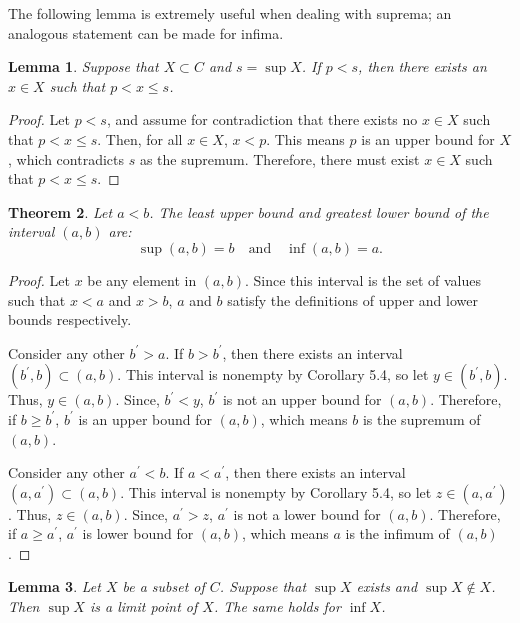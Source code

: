 \documentclass{amsart}
\newtheorem{theorem}{Theorem}
\newtheorem{lemma}[theorem]{Lemma}
\newcommand{\1}{\mathds{1}}
\numberwithin{equation}{section}
\numberwithin{theorem}{section}
\begin{document}
The following lemma is extremely useful when dealing with suprema; an analogous statement can be made for infima.
\begin{lemma} 
\label{lem1}
Suppose that $X \subset C$ and $s = \sup X$.
If $p<s$, then there exists an $x\in X$ such that $p < x \le s$.
\end{lemma} 

\begin{proof}
	Let $p<s$, and assume for contradiction that there exists no $x\in X$ such that $p < x \le s$. Then, for all $x\in X$, $x<p$. This means $p$ is an upper bound for $X$, which contradicts $s$ as the supremum. Therefore, there must exist $x\in X$ such that $p < x \le s$. 
\end{proof}

\begin{theorem}  Let $a < b$.  The least upper bound and greatest lower bound of the interval $(a,b)$ are:
\[
\sup (a,b) = b \quad \text{and} \quad \inf (a,b) = a.
\]
\end{theorem}

\begin{proof}
	Let $x$ be any element in $(a,b)$. Since this interval is the set of values such that $x<a$ and $x>b$, $a$ and $b$ satisfy the definitions of upper and lower bounds respectively. 
	
	Consider any other $b^\prime > a$. If $b>b^\prime$, then there exists an interval $(b^\prime,b)\subset (a,b)$. This interval is nonempty by Corollary 5.4, so let $y\in (b^\prime,b)$. Thus, $y\in (a,b)$. Since, $b^\prime < y$, $b^\prime$ is not an upper bound for $(a,b)$. Therefore, if $b \ge b^\prime$, $b^\prime$ is an upper bound for $(a,b)$, which means $b$ is the supremum of $(a,b)$.
	
	Consider any other $a^\prime < b$. If $a<a^\prime$, then there exists an interval $(a,a^\prime)\subset (a,b)$. This interval is nonempty by Corollary 5.4, so let $z\in (a,a^\prime)$. Thus, $z\in (a,b)$. Since, $a^\prime > z$, $a^\prime$ is not a lower bound for $(a,b)$. Therefore, if $a \ge a^\prime$, $a^\prime$ is lower bound for $(a,b)$, which means $a$ is the infimum of $(a,b)$.
\end{proof}


\begin{lemma}  
Let $X$ be a subset of $C$.
Suppose that $\sup X$ exists and $\sup X \notin X$.  Then $\sup X$ is a limit point of $X$.  The same holds for $\inf X$.
\end{lemma} 
\end{document}

